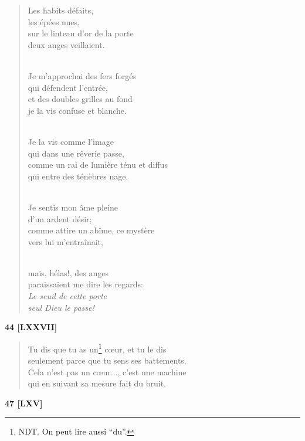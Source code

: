 \documentclass[a4paper,12pt]{book}
\begin{document}
\begin{verse}
Les habits défaits, \\
les épées nues, \\
sur le linteau d'or de la porte \\
deux anges veillaient. \\ \

Je m'approchai des fers forgés \\
qui défendent l'entrée, \\
et des doubles grilles au fond \\
je la vis confuse et blanche. \\ \

Je la vis comme l'image \\
qui dans une rêverie passe, \\
comme un rai de lumière ténu et diffus \\
qui entre des ténèbres nage. \\ \

Je sentis mon âme pleine \\
d'un ardent désir; \\
comme attire un abîme, ce mystère \\
vers lui m'entraînait, \\ \

mais, hélas!, des anges \\
paraissaient me dire les regards: \\
{\em Le seuil de cette porte \\
seul Dieu le passe!} \\
\end{verse}

\bigskip

\begin{center} {\bf 44 [LXXVII]} \end{center}

\begin{verse}
Tu dis que tu as un\footnote{NDT. On peut lire aussi ``du''.} c{\oe}ur, et tu le dis \\
seulement parce que tu sens ses battements. \\
Cela n'est pas un c{\oe}ur..., c'est une machine \\
qui en suivant sa mesure fait du bruit. \\
\end{verse}

\bigskip

\begin{center} {\bf 47 [LXV]} \end{center}
\end{document}
